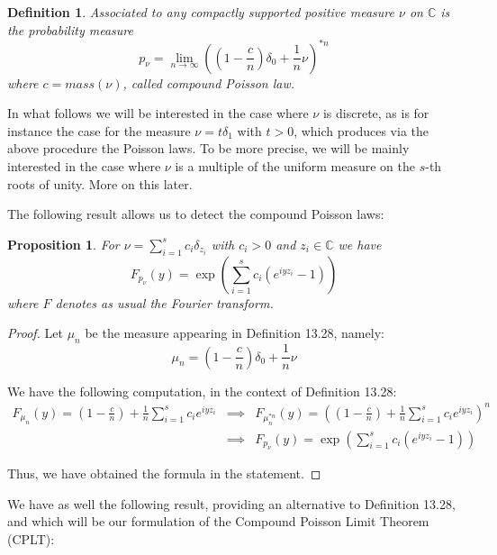 \documentclass[12pt]{amsbook}
\newtheorem{definition}[theorem]{Definition}
\newtheorem{proposition}[theorem]{Proposition}
\begin{document}

\begin{definition}
Associated to any compactly supported positive measure $\nu$ on $\mathbb C$ is the probability measure
$$p_\nu=\lim_{n\to\infty}\left(\left(1-\frac{c}{n}\right)\delta_0+\frac{1}{n}\nu\right)^{*n}$$
where $c=mass(\nu)$, called compound Poisson law.
\end{definition}

In what follows we will be interested in the case where $\nu$ is discrete, as is for instance the case for the measure $\nu=t\delta_1$ with $t>0$, which produces via the above procedure the Poisson laws. To be more precise, we will be mainly interested in the case where $\nu$ is a multiple of the uniform measure on the $s$-th roots of unity. More on this later.

\bigskip

The following result allows us to detect the compound Poisson laws:


\begin{proposition}
For $\nu=\sum_{i=1}^sc_i\delta_{z_i}$ with $c_i>0$ and $z_i\in\mathbb C$ we have
$$F_{p_\nu}(y)=\exp\left(\sum_{i=1}^sc_i(e^{iyz_i}-1)\right)$$
where $F$ denotes as usual the Fourier transform.
\end{proposition}

\begin{proof}
Let $\mu_n$ be the measure appearing in Definition 13.28, namely:
$$\mu_n=\left(1-\frac{c}{n}\right)\delta_0+\frac{1}{n}\nu$$

We have the following computation, in the context of Definition 13.28:
\begin{eqnarray*}
F_{\mu_n}(y)=\left(1-\frac{c}{n}\right)+\frac{1}{n}\sum_{i=1}^sc_ie^{iyz_i}
&\implies&F_{\mu_n^{*n}}(y)=\left(\left(1-\frac{c}{n}\right)+\frac{1}{n}\sum_{i=1}^sc_ie^{iyz_i}\right)^n\\
&\implies&F_{p_\nu}(y)=\exp\left(\sum_{i=1}^sc_i(e^{iyz_i}-1)\right)
\end{eqnarray*}

Thus, we have obtained the formula in the statement.
\end{proof}

We have as well the following result, providing an alternative to Definition 13.28, and which will be our formulation of the Compound Poisson Limit Theorem (CPLT):

\end{document}

